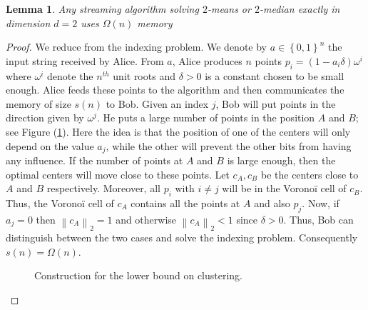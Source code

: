 \documentclass[a4paper,11pt,oneside,english,onecolumn]{article}
\newtheorem{lemma}[theorem]{Lemma}
\theoremstyle{definition}
\newcommand{\br}[1]{\left\{#1\right\}}                            \renewcommand{\Pr}[1]{\ensuremath{\mathbf{Pr}\left[#1\right]}}
\newcommand{\norm}[1]{\ensuremath{\left\| #1\right\|_2}}
\begin{document}
\begin{lemma}
\label{lower:exact}
Any streaming algorithm solving $2$-means or $2$-median exactly in dimension $d=2$ uses $\Omega(n)$ memory
\end{lemma}
\begin{proof}
We reduce from the indexing problem. We denote by $a \in \br{0,1}^n$ the input string received by Alice. From $a$, Alice produces $n$ points $p_i=(1 - a_i \delta) \omega^i$ where $\omega^i$ denote the $n^{th}$ unit roots and $\delta>0$ is a constant chosen to be small enough. Alice feeds these points to the algorithm and then communicates the memory of size $s(n)$ to Bob. Given an index $j$, Bob will put points in the direction given by $\omega^j$. He puts a large number of points in the position $A$ and $B$; see Figure (\ref{figure:lowerBoundClustering}). Here the idea is that the position of one of the centers will only depend on the value $a_j$, while the other will prevent the other bits from having any influence. If the number of points at $A$ and $B$ is large enough, then the optimal centers will move close to these points. Let $c_A,c_B$ be the centers close to $A$ and $B$ respectively. Moreover, all $p_i$ with $i\neq j$ will be in the Vorono\"i cell of $c_B$. Thus, the Vorono\"i cell of $c_A$ contains all the points at $A$ and also $p_j$. Now, if $a_j=0$ then $\norm{c_A}=1$ and otherwise $\norm{c_A}<1$ since $\delta>0$. Thus, Bob can distinguish between the two cases and solve the indexing problem. Consequently $s(n)=\Omega(n)$.
\begin{figure}
\center
{}
\caption{Construction for the lower bound on clustering.
}
\label{figure:lowerBoundClustering}
\end{figure}
\end{proof}
\end{document}
